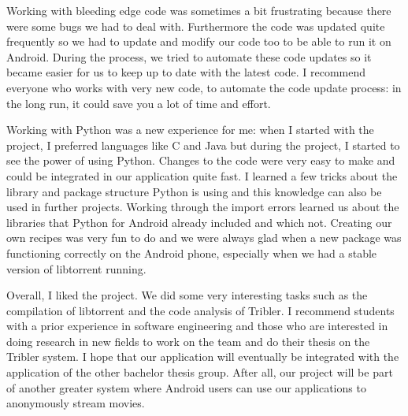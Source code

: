 			Working with bleeding edge code was sometimes a bit frustrating because there were some bugs we had to deal with. Furthermore the code was updated quite frequently so we had to update and modify our code too to be able to run it on Android. During the process, we tried to automate these code updates so it became easier for us to keep up to date with the latest code. I recommend everyone who works with very new code, to automate the code update process: in the long run, it could save you a lot of time and effort.
		
	  		Working with Python was a new experience for me: when I started with the project, I preferred languages like C and Java but during the project, I started to see the power of using Python. Changes to the code were very easy to make and could be integrated in our application quite fast. I learned a few tricks about the library and package structure Python is using and this knowledge can also be used in further projects. Working through the import errors learned us about the libraries that Python for Android already included and which not. Creating our own recipes was very fun to do and we were always glad when a new package was functioning correctly on the Android phone, especially when we had a stable version of libtorrent running.
	 	
	 		Overall, I liked the project. We did some very interesting tasks such as the compilation of libtorrent and the code analysis of Tribler. I recommend students with a prior experience in software engineering and those who are interested in doing research in new fields to work on the team and do their thesis on the Tribler system. I hope that our application will eventually be integrated with the application of the other bachelor thesis group. After all, our project will be part of another greater system where Android users can use our applications to anonymously stream movies.
